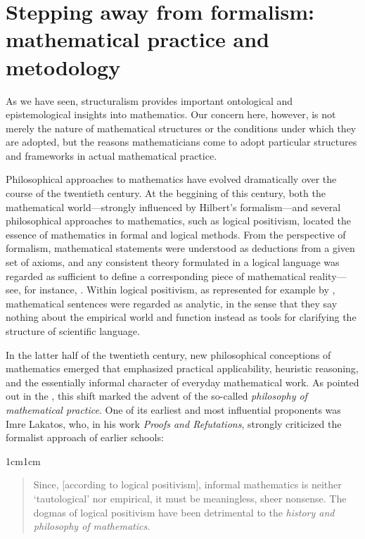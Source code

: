 \documentclass[11pt,a4paper]{article}
\begin{document}
\section{Stepping away from formalism: mathematical practice and metodology}
\label{quasi-emp-structuralism}

As we have seen, structuralism provides important ontological and epistemological insights into mathematics. Our concern here, however, is not merely the nature of mathematical structures or the conditions under which they are adopted, but the reasons mathematicians come to adopt particular structures and frameworks in actual mathematical practice.

Philosophical approaches to mathematics have evolved dramatically over the course of the twentieth century. At the beggining of this century, both the mathematical world—strongly influenced by Hilbert’s formalism—and several philosophical approaches to mathematics, such as logical positivism, located the essence of mathematics in formal and logical methods. From the perspective of formalism, mathematical statements were understood as deductions from a given set of axioms, and any consistent theory formulated in a logical language was regarded as sufficient to define a corresponding piece of mathematical reality—see, for instance, \textcite{hilbert1971geometry}. Within logical positivism, as represented for example by \textcite{carnap1937syntax}, mathematical sentences were regarded as analytic, in the sense that they say nothing about the empirical world and function instead as tools for clarifying the structure of scientific language.

In the latter half of the twentieth century, new philosophical conceptions of mathematics emerged that emphasized practical applicability, heuristic reasoning, and the essentially informal character of everyday mathematical work. As pointed out in the , this shift marked the advent of the so-called \textit{philosophy of mathematical practice}. One of its earliest and most influential proponents was Imre Lakatos, who, in his work \textit{Proofs and Refutations}, strongly criticized the formalist approach of earlier schools:

\begin{adjustwidth}{1cm}{1cm}
\small
\begin{quote}
Since, [according to logical positivism], informal mathematics is neither `tautological' nor empirical, it must be meaningless, sheer nonsense. The dogmas of logical positivism have been detrimental to the \textit{history and philosophy of mathematics}. \parencite[p. 2]{Lakatos1976}
\end{quote}
\end{adjustwidth}
\end{document}
